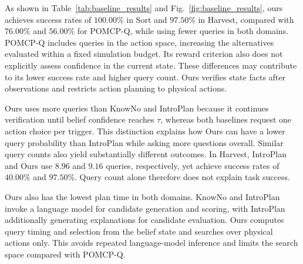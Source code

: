 

As shown in Table~\ref{tab:baseline_results} and Fig.~\ref{fig:baseline_results}, ours achieves success rates of $100.00\%$ in Sort and $97.50\%$ in Harvest, compared with $76.00\%$ and $56.00\%$ for POMCP-Q, while using fewer queries in both domains. POMCP-Q includes queries in the action space, increasing the alternatives evaluated within a fixed simulation budget. Its reward criterion also does not explicitly assess confidence in the current state. These differences may contribute to its lower success rate and higher query count. Ours verifies state facts after observations and restricts action planning to physical actions.

Ours uses more queries than KnowNo and IntroPlan because it continues verification until belief confidence reaches $\tau$, whereas both baselines request one action choice per trigger. This distinction explains how Ours can have a lower query probability than IntroPlan while asking more questions overall. Similar query counts also yield substantially different outcomes. In Harvest, IntroPlan and Ours use $8.96$ and $9.16$ queries, respectively, yet achieve success rates of $40.00\%$ and $97.50\%$. Query count alone therefore does not explain task success.

Ours also has the lowest plan time in both domains. KnowNo and IntroPlan invoke a language model for candidate generation and scoring, with IntroPlan additionally generating explanations for candidate evaluation. Ours computes query timing and selection from the belief state and searches over physical actions only. This avoids repeated language-model inference and limits the search space compared with POMCP-Q.



